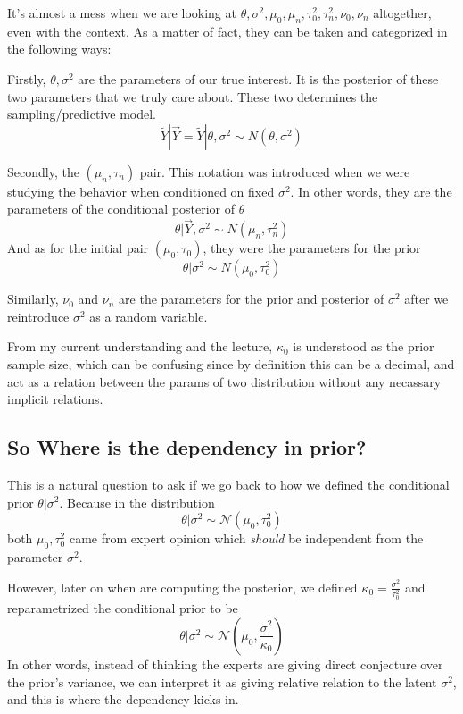 It's almost a mess when we are looking at $\theta, \sigma^2, \mu_0, \mu_n, \tau_0^2, \tau_n^2, \nu_0, \nu_n$ altogether, even with the context. As a matter of fact, they can be taken and categorized in the following ways:

Firstly, $\theta, \sigma^2$ are the parameters of our true interest. It is the posterior of these two parameters that we truly care about. These two determines the sampling/predictive model. 
\begin{equation*}
    \tilde{Y} | \vec{Y} = \tilde{Y} | \theta, \sigma^2 \sim N(\theta, \sigma^2)
\end{equation*}

Secondly, the $(\mu_n, \tau_n)$ pair. This notation was introduced when we were studying the behavior when conditioned on fixed $\sigma^2$. In other words, they are the parameters of the conditional posterior of $\theta$
\begin{equation*}
    \theta | \vec{Y}, \sigma^2 \sim N(\mu_n, \tau_n^2)
\end{equation*}
And as for the initial pair $(\mu_0, \tau_0)$, they were the parameters for the prior
\begin{equation*}
    \theta | \sigma^2 \sim N(\mu_0, \tau_0^2)
\end{equation*}

Similarly, $\nu_0$ and $\nu_n$ are the parameters for the prior and posterior of $\sigma^2$ after we reintroduce $\sigma^2$ as a random variable. 

From my current understanding and the lecture, $\kappa_0$ is understood as the prior sample size, which can be confusing since by definition this can be a decimal, and act as a relation between the params of two distribution without any necassary implicit relations.

\subsection*{So Where is the dependency in prior?}
This is a natural question to ask if we go back to how we defined the conditional prior $\theta | \sigma^2$. Because in the distribution
\begin{equation*}
    \theta | \sigma^2 \sim \mathcal{N}(\mu_0, \tau_0^2)
\end{equation*}
both $\mu_0, \tau_0^2$ came from expert opinion which \emph{should} be independent from the parameter $\sigma^2$. 

However, later on when are computing the posterior, we defined $\kappa_0 = \frac{\sigma^2}{\tau_0^2}$ and reparametrized the conditional prior to be
\begin{equation*}
    \theta | \sigma^2 \sim \mathcal{N}(\mu_0, \frac{\sigma^2}{\kappa_0})
\end{equation*}
In other words, instead of thinking the experts are giving direct conjecture over the prior's variance, we can interpret it as giving relative relation to the latent $\sigma^2$, and this is where the dependency kicks in. 

